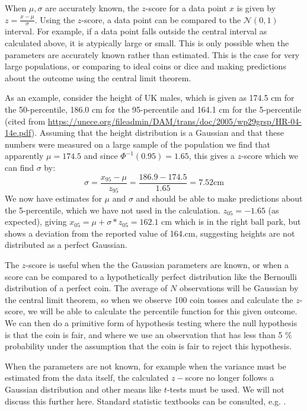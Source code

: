   When $\mu, \sigma$ are accurately known, the $z$-score for a data point $x$ is given by $z=\frac{x-\mu}{\sigma}$. Using the $z$-score, a data point can be compared
  to the $\mathcal{N}(0,1)$ interval. For example, if a data point falls outside the central interval as calculated above, it is atypically large or small. 
  This is only possible when the parameters are accurately known rather than estimated. This is the case for very large populations, or comparing to ideal coins or dice
  and making predictions about the outcome using the central limit theorem.

  As an example, consider the height of UK males, which is given as 174.5 cm for the 50-percentile, 186.0 cm for the 95-percentile and 164.1 cm for the 5-percentile
  \cite{heights} (cited from \url{https://unece.org/fileadmin/DAM/trans/doc/2005/wp29grsp/HR-04-14e.pdf}).
  Assuming that
  the height distribution is a Gaussian and that these numbers were measured on a large sample of the population we find that apparently
  $\mu = 174.5$ and since $\Phi^{-1}(0.95) = 1.65$, this gives a $z$-score which we can find $\sigma$ by:
  $$
  \sigma = \frac{x_{95} - \mu}{z_{95}} = \frac{186.9 - 174.5}{1.65} = 7.52 \mbox{cm}
  $$
  We now have estimates for $\mu$ and $\sigma$ and should be able to make predictions about the 5-percentile, which we have not used in the calculation.
  $z_{05} = -1.65$ (as expected), giving $x_{05} = \mu + \sigma*z_{05} = 162.1$ cm which is in the right ball park, but shows a deviation from the reported value
  of 164.cm, suggesting heights are not distributed as a perfect Gaussian.

  The $z$-score is useful when the the Gaussian parameters are known, or when a score can be compared to a hypothetically perfect distribution like the Bernoulli
  distribution of a perfect coin. The average of $N$ observations will be Gaussian by the central limit theorem, so when we observe 100 coin tosses and calculate
  the $z$-score, we will be able to calculate the percentile function for this given outcome. We can then do a primitive form of hypothesis testing where the null hypothesis
  is that the coin is fair, and where we use an observation that has less than 5 \% probability under the assumption that the coin is fair to reject this hypothesis.

  When the parameters are not known, for example when the variance must be estimated from the data itself, the calculated $z-$score
  no longer follows a Gaussian distribution and other means like $t$-tests must be used. We will not discuss this further here. Standard statistic textbooks can
  be consulted, e.g. \cite{gardiner2009}.
  

